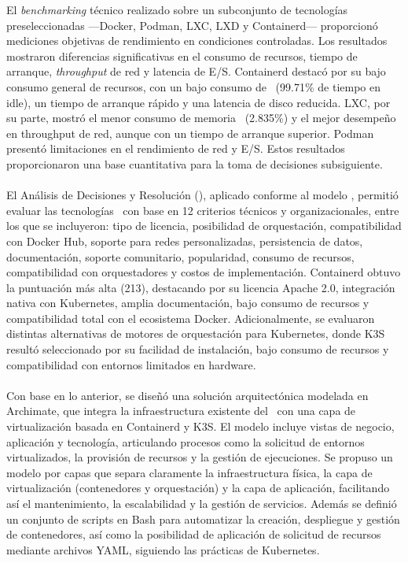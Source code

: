 \noindent
El \textit{benchmarking} técnico realizado sobre un subconjunto de tecnologías preseleccionadas —Docker, Podman, LXC, LXD y Containerd— proporcionó mediciones objetivas de rendimiento en condiciones controladas. Los resultados mostraron diferencias significativas en el consumo de recursos, tiempo de arranque, \textit{throughput} de red y latencia de E/S. Containerd destacó por su bajo consumo general de recursos, con un bajo consumo de \CPU\ (99.71\% de tiempo en idle), un tiempo de arranque rápido y una latencia de disco reducida. LXC, por su parte, mostró el menor consumo de memoria \RAM\ (2.835\%) y el mejor desempeño en throughput de red, aunque con un tiempo de arranque superior. Podman presentó limitaciones en el rendimiento de red y E/S. Estos resultados proporcionaron una base cuantitativa para la toma de decisiones subsiguiente. \\ \\
\noindent
El Análisis de Decisiones y Resolución (\DAR), aplicado conforme al modelo \CMMI, permitió evaluar las tecnologías \VBC\ con base en 12 criterios técnicos y organizacionales, entre los que se incluyeron: tipo de licencia, posibilidad de orquestación, compatibilidad con Docker Hub, soporte para redes personalizadas, persistencia de datos, documentación, soporte comunitario, popularidad, consumo de recursos, compatibilidad con orquestadores y costos de implementación. Containerd obtuvo la puntuación más alta (213), destacando por su licencia Apache 2.0, integración nativa con Kubernetes, amplia documentación, bajo consumo de recursos y compatibilidad total con el ecosistema Docker. Adicionalmente, se evaluaron distintas alternativas de motores de orquestación para Kubernetes, donde K3S resultó seleccionado por su facilidad de instalación, bajo consumo de recursos y compatibilidad con entornos limitados en hardware. \\ \\
\noindent
Con base en lo anterior, se diseñó una solución arquitectónica modelada en Archimate, que integra la infraestructura existente del \GRID\ con una capa de virtualización basada en Containerd y K3S. El modelo incluye vistas de negocio, aplicación y tecnología, articulando procesos como la solicitud de entornos virtualizados, la provisión de recursos y la gestión de ejecuciones. Se propuso un modelo por capas que separa claramente la infraestructura física, la capa de virtualización (contenedores y orquestación) y la capa de aplicación, facilitando así el mantenimiento, la escalabilidad y la gestión de servicios. Además se definió un conjunto de scripts en Bash para automatizar la creación, despliegue y gestión de contenedores, así como la posibilidad de aplicación de solicitud de recursos mediante archivos YAML, siguiendo las prácticas de Kubernetes. \\ \\

